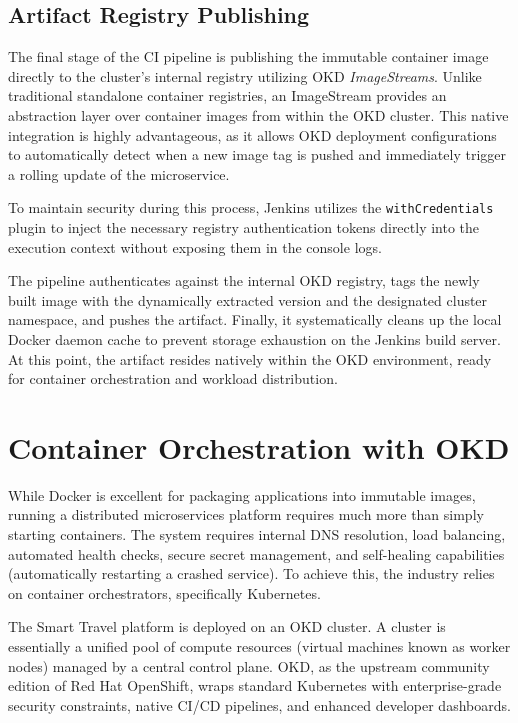 \subsection{Artifact Registry Publishing}

The final stage of the CI pipeline is publishing the immutable container image directly to the cluster's internal registry utilizing OKD \textit{ImageStreams}. Unlike traditional standalone container registries, an ImageStream provides an abstraction layer over container images from within the OKD cluster. This native integration is highly advantageous, as it allows OKD deployment configurations to automatically detect when a new image tag is pushed and immediately trigger a rolling update of the microservice.

To maintain security during this process, Jenkins utilizes the \texttt{withCredentials} plugin to inject the necessary registry authentication tokens directly into the execution context without exposing them in the console logs. 

The pipeline authenticates against the internal OKD registry, tags the newly built image with the dynamically extracted version and the designated cluster namespace, and pushes the artifact. Finally, it systematically cleans up the local Docker daemon cache to prevent storage exhaustion on the Jenkins build server. At this point, the artifact resides natively within the OKD environment, ready for container orchestration and workload distribution.


\section{Container Orchestration with OKD}
\label{sec:container_orchestration}

While Docker is excellent for packaging applications into immutable images, running a distributed microservices platform requires much more than simply starting containers. The system requires internal DNS resolution, load balancing, automated health checks, secure secret management, and self-healing capabilities (automatically restarting a crashed service). To achieve this, the industry relies on container orchestrators, specifically Kubernetes. 

The Smart Travel platform is deployed on an OKD cluster. A cluster is essentially a unified pool of compute resources (virtual machines known as worker nodes) managed by a central control plane. OKD, as the upstream community edition of Red Hat OpenShift, wraps standard Kubernetes with enterprise-grade security constraints, native \gls{CI/CD} pipelines, and enhanced developer dashboards.

